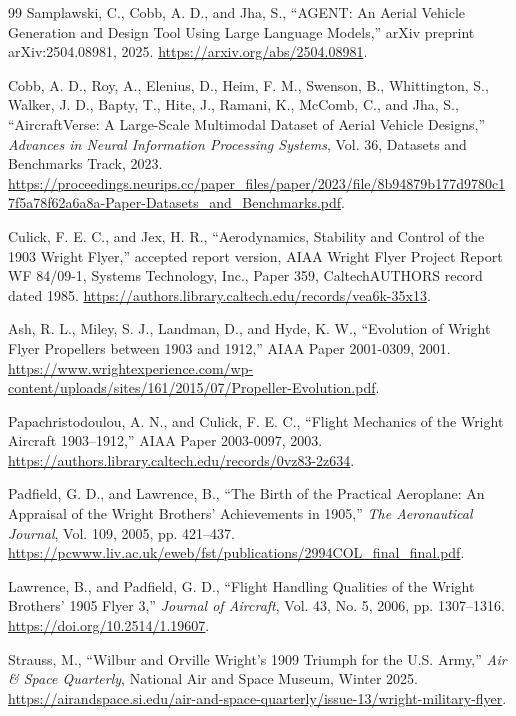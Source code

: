 \documentclass[11pt,a4paper]{article}
\begin{document}
\begin{thebibliography}{99}
 Samplawski, C., Cobb, A. D., and Jha, S., ``AGENT: An Aerial Vehicle Generation and Design Tool Using Large Language Models,'' arXiv preprint arXiv:2504.08981, 2025. \url{https://arxiv.org/abs/2504.08981}.

 Cobb, A. D., Roy, A., Elenius, D., Heim, F. M., Swenson, B., Whittington, S., Walker, J. D., Bapty, T., Hite, J., Ramani, K., McComb, C., and Jha, S., ``AircraftVerse: A Large-Scale Multimodal Dataset of Aerial Vehicle Designs,'' \emph{Advances in Neural Information Processing Systems}, Vol. 36, Datasets and Benchmarks Track, 2023. \url{https://proceedings.neurips.cc/paper_files/paper/2023/file/8b94879b177d9780c17f5a78f62a6a8a-Paper-Datasets_and_Benchmarks.pdf}.

 Culick, F. E. C., and Jex, H. R., ``Aerodynamics, Stability and Control of the 1903 Wright Flyer,'' accepted report version, AIAA Wright Flyer Project Report WF 84/09-1, Systems Technology, Inc., Paper 359, CaltechAUTHORS record dated 1985. \url{https://authors.library.caltech.edu/records/vea6k-35x13}.

 Ash, R. L., Miley, S. J., Landman, D., and Hyde, K. W., ``Evolution of Wright Flyer Propellers between 1903 and 1912,'' AIAA Paper 2001-0309, 2001. \url{https://www.wrightexperience.com/wp-content/uploads/sites/161/2015/07/Propeller-Evolution.pdf}.

 Papachristodoulou, A. N., and Culick, F. E. C., ``Flight Mechanics of the Wright Aircraft 1903--1912,'' AIAA Paper 2003-0097, 2003. \url{https://authors.library.caltech.edu/records/0vz83-2z634}.

 Padfield, G. D., and Lawrence, B., ``The Birth of the Practical Aeroplane: An Appraisal of the Wright Brothers' Achievements in 1905,'' \emph{The Aeronautical Journal}, Vol. 109, 2005, pp. 421--437. \url{https://pcwww.liv.ac.uk/eweb/fst/publications/2994COL_final_final.pdf}.

 Lawrence, B., and Padfield, G. D., ``Flight Handling Qualities of the Wright Brothers' 1905 Flyer 3,'' \emph{Journal of Aircraft}, Vol. 43, No. 5, 2006, pp. 1307--1316. \url{https://doi.org/10.2514/1.19607}.

 Strauss, M., ``Wilbur and Orville Wright's 1909 Triumph for the U.S. Army,'' \emph{Air \& Space Quarterly}, National Air and Space Museum, Winter 2025. \url{https://airandspace.si.edu/air-and-space-quarterly/issue-13/wright-military-flyer}.


\end{thebibliography}
\end{document}
